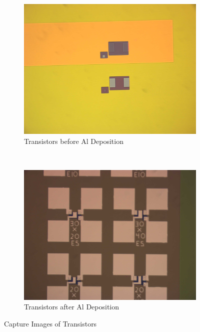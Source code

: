 \documentclass[letter,12pt]{article}
\begin{document}
		\begin{figure}[h!]
			\centering
			\begin{subfigure}[b]{.45\textwidth}
				\includegraphics[width=\textwidth]{./Images/5_Nov_Transistors.jpg}
				\caption{Transistors before Al Deposition}
			\end{subfigure}
			~
			\begin{subfigure}[b]{.45\textwidth}
				\includegraphics[width=\textwidth]{./Images/19_Nov_Transistors.jpg}
				\caption{Transistors after Al Deposition}
			\end{subfigure}
			\caption{Capture Images of Transistors}
			\label{fig:T_Image}
		\end{figure}
	
\end{document}
